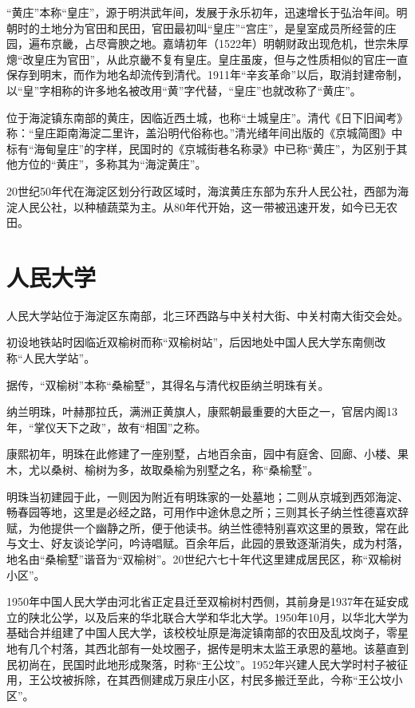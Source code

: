 “黄庄”本称“皇庄”，源于明洪武年间，发展于永乐初年，迅速增长于弘治年间。明朝时的土地分为官田和民田，官田最初叫“皇庄”“宫庄”，是皇室成员所经营的庄园，遍布京畿，占尽膏腴之地。嘉靖初年（1522年）明朝财政出现危机，世宗朱厚熜“改皇庄为官田”，从此京畿不复有皇庄。皇庄虽废，但与之性质相似的官庄一直保存到明末，而作为地名却流传到清代。1911年“辛亥革命”以后，取消封建帝制，以“皇”字相称的许多地名被改用“黄”字代替，“皇庄”也就改称了“黄庄”。

位于海淀镇东南部的黄庄，因临近西土城，也称“土城皇庄”。清代《日下旧闻考》称：“皇庄距南海淀二里许，盖沿明代俗称也。”清光绪年间出版的《京城简图》中标有“海甸皇庄”的字样，民国时的《京城街巷名称录》中已称“黄庄”，为区别于其他方位的“黄庄”，多称其为“海淀黄庄”。

20世纪50年代在海淀区划分行政区域时，海滨黄庄东部为东升人民公社，西部为海淀人民公社，以种植蔬菜为主。从80年代开始，这一带被迅速开发，如今已无农田。

\section{人民大学}
人民大学站位于海淀区东南部，北三环西路与中关村大街、中关村南大街交会处。

初设地铁站时因临近双榆树而称“双榆树站”，后因地处中国人民大学东南侧改称“人民大学站”。

据传，“双榆树”本称“桑榆墅”，其得名与清代权臣纳兰明珠有关。

纳兰明珠，叶赫那拉氏，满洲正黄旗人，康熙朝最重要的大臣之一，官居内阁13年，“掌仪天下之政”，故有“相国”之称。

康熙初年，明珠在此修建了一座别墅，占地百余亩，园中有庭舍、回廊、小楼、果木，尤以桑树、榆树为多，故取桑榆为别墅之名，称“桑榆墅”。

明珠当初建园于此，一则因为附近有明珠家的一处墓地；二则从京城到西郊海淀、畅春园等地，这里是必经之路，可用作中途休息之所；三则其长子纳兰性德喜欢辞赋，为他提供一个幽静之所，便于他读书。纳兰性德特别喜欢这里的景致，常在此与文士、好友谈论学问，吟诗唱赋。百余年后，此园的景致逐渐消失，成为村落，地名由“桑榆墅”谐音为“双榆树”。20世纪六七十年代这里建成居民区，称“双榆树小区”。

1950年中国人民大学由河北省正定县迁至双榆树村西侧，其前身是1937年在延安成立的陕北公学，以及后来的华北联合大学和华北大学。1950年10月，以华北大学为基础合并组建了中国人民大学，该校校址原是海淀镇南部的农田及乱坟岗子，零星地有几个村落，其西北部有一处坟圈子，据传是明末太监王承恩的墓地。该墓直到民初尚在，民国时此地形成聚落，时称“王公坟”。1952年兴建人民大学时村子被征用，王公坟被拆除，在其西侧建成万泉庄小区，村民多搬迁至此，今称“王公坟小区”。

